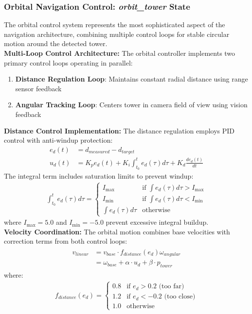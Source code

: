 \subsubsection*{Orbital Navigation Control: \textit{orbit\_tower} State}
The orbital control system represents the most sophisticated aspect of the navigation architecture, combining multiple control loops for stable circular motion around the detected tower.\\
\textbf{Multi-Loop Control Architecture:}
The orbital controller implements two primary control loops operating in parallel:
\begin{enumerate}
\item \textbf{Distance Regulation Loop}: Maintains constant radial distance using range sensor feedback
\item \textbf{Angular Tracking Loop}: Centers tower in camera field of view using vision feedback
\end{enumerate}
\textbf{Distance Control Implementation:}
The distance regulation employs PID control with anti-windup protection:
\begin{align}
e_d(t) &= d_{measured} - d_{target} \\
u_d(t) &= K_p e_d(t) + K_i \int_{t_0}^t e_d(\tau) d\tau + K_d \frac{de_d(t)}{dt}
\end{align}
The integral term includes saturation limits to prevent windup:
\begin{align}
\int_{t_0}^t e_d(\tau) d\tau = \begin{cases}
I_{\max} & \text{if } \int e_d(\tau) d\tau > I_{\max} \\
I_{\min} & \text{if } \int e_d(\tau) d\tau < I_{\min} \\
\int e_d(\tau) d\tau & \text{otherwise}
\end{cases}
\end{align}
where $I_{\max} = 5.0$ and $I_{\min} = -5.0$ prevent excessive integral buildup.\\
\textbf{Velocity Coordination:}
The orbital motion combines base velocities with correction terms from both control loops:
\begin{align}
\begin{split}
    v_{linear} &= v_{base} \cdot f_{distance}(e_d) \omega_{angular} \\
            &= \omega_{base} + \alpha \cdot u_d + \beta \cdot p_{tower}
\end{split}
\end{align}
where:
\begin{align}
f_{distance}(e_d) = \begin{cases}
0.8 & \text{if } e_d > 0.2 \text{ (too far)} \\
1.2 & \text{if } e_d < -0.2 \text{ (too close)} \\
1.0 & \text{otherwise}
\end{cases}
\end{align}
